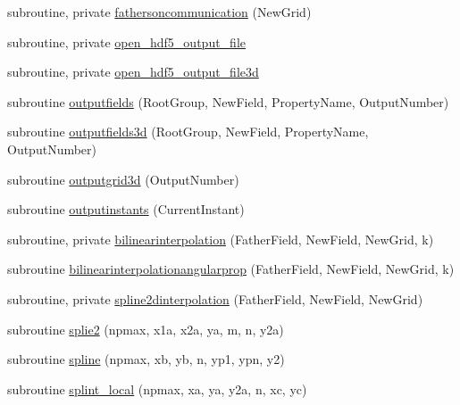 \begin{DoxyCompactItemize}
\item 
subroutine, private \mbox{\hyperlink{namespacemoduleinterpolategrids_a20e11038e33700a28ecb799dc0420e26}{fathersoncommunication}} (New\+Grid)
\item 
subroutine, private \mbox{\hyperlink{namespacemoduleinterpolategrids_adb5ceaa8539e3f7a80b1968dfc2bb3f7}{open\+\_\+hdf5\+\_\+output\+\_\+file}}
\item 
subroutine, private \mbox{\hyperlink{namespacemoduleinterpolategrids_a6d188a490cb72184e7a2cec4c423af97}{open\+\_\+hdf5\+\_\+output\+\_\+file3d}}
\item 
subroutine \mbox{\hyperlink{namespacemoduleinterpolategrids_ad87c7dfcb85e39e6f0f2e95dd4f65391}{outputfields}} (Root\+Group, New\+Field, Property\+Name, Output\+Number)
\item 
subroutine \mbox{\hyperlink{namespacemoduleinterpolategrids_aa57bfeb2d55f2dec2c8b2e7b627fd6bf}{outputfields3d}} (Root\+Group, New\+Field, Property\+Name, Output\+Number)
\item 
subroutine \mbox{\hyperlink{namespacemoduleinterpolategrids_a95af09d76985241fb13663924158fb28}{outputgrid3d}} (Output\+Number)
\item 
subroutine \mbox{\hyperlink{namespacemoduleinterpolategrids_a43f25c3ca1c96f174547603ebbf37ad0}{outputinstants}} (Current\+Instant)
\item 
subroutine, private \mbox{\hyperlink{namespacemoduleinterpolategrids_aa9562e1a85edb00f05d06ebe2ec3f113}{bilinearinterpolation}} (Father\+Field, New\+Field, New\+Grid, k)
\item 
subroutine \mbox{\hyperlink{namespacemoduleinterpolategrids_ad1fbdcc1429662d0522479b1e7933859}{bilinearinterpolationangularprop}} (Father\+Field, New\+Field, New\+Grid, k)
\item 
subroutine, private \mbox{\hyperlink{namespacemoduleinterpolategrids_a5189e275a7867c5dd3f1a55dca3dacf3}{spline2dinterpolation}} (Father\+Field, New\+Field, New\+Grid)
\item 
subroutine \mbox{\hyperlink{namespacemoduleinterpolategrids_aaaaf0fdabdeb343cb80f4c083588e3ec}{splie2}} (npmax, x1a, x2a, ya, m, n, y2a)
\item 
subroutine \mbox{\hyperlink{namespacemoduleinterpolategrids_ab307084ecee857465992d138cb9d22d3}{spline}} (npmax, xb, yb, n, yp1, ypn, y2)
\item 
subroutine \mbox{\hyperlink{namespacemoduleinterpolategrids_a6c7fccee42f4e09612054b2280c92034}{splint\+\_\+local}} (npmax, xa, ya, y2a, n, xc, yc)
\item 

\end{DoxyCompactItemize}
